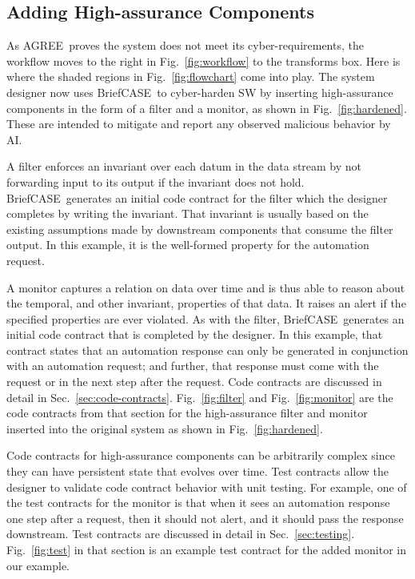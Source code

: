 \documentclass[global,twocolumn]{svjour}
\newcommand{\figref}[1]{Fig.~\ref{#1}}
\newcommand{\secref}[1]{Sec.~\ref{#1}}
\newcommand{\brfcs}{BriefCASE}
\newcommand{\agr}{AGREE}
\begin{document}

\subsection{Adding High-assurance Components}

As \agr\ proves the system does not meet its cyber-requirements, the workflow moves to the right in \figref{fig:workflow} to the transforms box.
%
Here is where the shaded regions in \figref{fig:flowchart} come into play.
%
The system designer now uses \brfcs\ to cyber-harden SW by inserting high-assurance components in the form of a filter and a monitor, as shown in \figref{fig:hardened}.
%
These are intended to mitigate and report any observed malicious behavior by AI.

A filter enforces an invariant over each datum in the data stream by not forwarding input to its output if the invariant does not hold.
%
\brfcs\ generates an initial code contract for the filter which the designer completes by writing the invariant.
%
That invariant is usually based on the existing assumptions made by downstream components that consume the filter output.
%
In this example, it is the well-formed property for the automation request.

A monitor captures a relation on data over time and is thus able to reason about the temporal, and other invariant, properties of that data.
%
It raises an alert if the specified properties are ever violated.
%
As with the filter, \brfcs\ generates an initial code contract that is completed by the designer.
%
In this example, that contract states that an automation response can only be generated in conjunction with an automation request;
%
and further, that response must come with the request or in the next step after the request.
%
Code contracts are discussed in detail in \secref{sec:code-contracts}.
%
\figref{fig:filter} and \figref{fig:monitor} are the code contracts from that section for the high-assurance filter and monitor inserted into the original system as shown in \figref{fig:hardened}.

Code contracts for high-assurance components can be arbitrarily complex since they can have persistent state that evolves over time.
%
Test contracts allow the designer to validate code contract behavior with unit testing.
For example, one of the test contracts for the monitor is that when it sees an automation response one step after a request, then it should not alert, and it should pass the response downstream.
%
Test contracts are discussed in detail in \secref{sec:testing}.
%
\figref{fig:test} in that section is an example test contract for the added monitor in our example.
\end{document}
